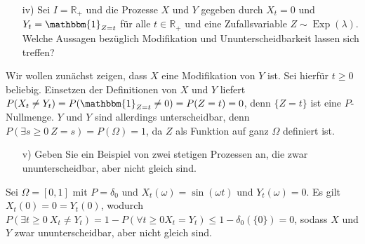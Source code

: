 \documentclass{article}
\begin{document}
\begin{itemize}
\item [iv)] Sei $I=\mathbb{R}_+$ und die Prozesse $X$ und $Y$ gegeben durch $X_t=0$ und $Y_t=\mathbbm{1}_{Z=t}$ für alle $t\in\mathbb{R}_+$ und eine Zufallsvariable $Z\sim\operatorname{Exp}(\lambda)$.
  Welche Aussagen bezüglich Modifikation und Ununterscheidbarkeit lassen sich treffen? 
\end{itemize}
Wir wollen zunächst zeigen, dass $X$ eine Modifikation von $Y$ ist.
Sei hierfür $t\geq0$ beliebig.
Einsetzen der Definitionen von $X$ und $Y$ liefert $P(X_t\neq Y_t)=P(\mathbbm{1}_{Z=t}\neq0)=P(Z=t)=0$, denn $\{Z=t\}$ ist eine $P$-Nullmenge.
$Y$ und $Y$ sind allerdings unterscheidbar, denn $P(\exists s\geq0~Z=s)=P(\Omega)=1$, da $Z$ als Funktion auf ganz $\Omega$ definiert ist.
\begin{itemize}
\item [v)] Geben Sie ein Beispiel von zwei stetigen Prozessen an, die zwar un\-un\-ter\-scheid\-bar, aber nicht gleich sind.
\end{itemize}
Sei $\Omega=[0,1]$ mit $P=\delta_0$ und $X_t(\omega)=\sin(\omega t)$ und $Y_t(\omega)=0$.
Es gilt $X_t(0)=0=Y_t(0)$, wodurch $P(\exists t\geq0~X_t\neq Y_t)=1-P(\forall t\geq0 X_t=Y_t)\leq1-\delta_0(\{0\})=0$, sodass $X$ und $Y$ zwar ununterscheidbar, aber nicht gleich sind.
\pagebreak
\end{document}
